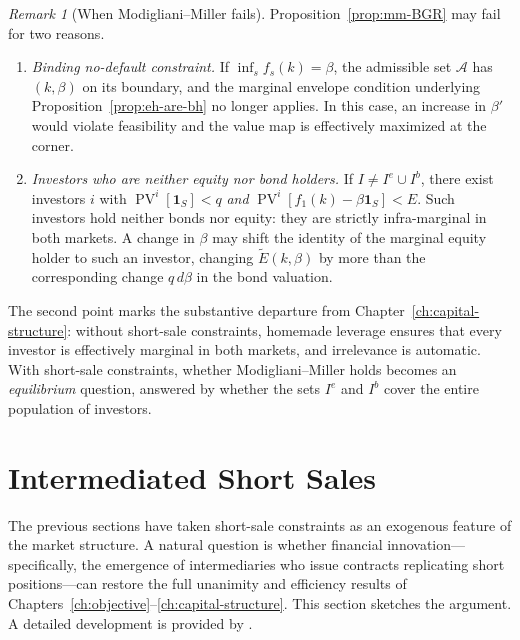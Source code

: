 \documentclass[11pt,a4paper,oneside]{book}
\def\1{\mathbf{1}}
\DeclareMathOperator{\PV}{PV}
\theoremstyle{plain}
\theoremstyle{definition}
\theoremstyle{remark}
\newtheorem{remark}[theorem]{Remark}
\numberwithin{equation}{chapter}
\begin{document}
\begin{remark}[When Modigliani--Miller fails]\label{rem:mm-fails-BGR}
Proposition~\ref{prop:mm-BGR} may fail for two reasons.
\begin{enumerate}
  \item \emph{Binding no-default constraint.}
  If $\inf_s f_s(k) = \beta$, the admissible set $\mathcal{A}$ has $(k, \beta)$ on its boundary, and the marginal envelope condition underlying Proposition~\ref{prop:eh-are-bh} no longer applies.
  In this case, an increase in $\beta'$ would violate feasibility and the value map is effectively maximized at the corner.
  \item \emph{Investors who are neither equity nor bond holders.}
  If $I \neq I^e \cup I^b$, there exist investors $i$ with $\PV^i[\1_S] < q$ \emph{and} $\PV^i[f_1(k) - \beta \1_S] < E$.
  Such investors hold neither bonds nor equity: they are strictly infra-marginal in both markets.
  A change in $\beta$ may shift the identity of the marginal equity holder to such an investor, changing $\widetilde{E}(k, \beta)$ by more than the corresponding change $q \, d\beta$ in the bond valuation.
\end{enumerate}
The second point marks the substantive departure from Chapter~\ref{ch:capital-structure}: without short-sale constraints, homemade leverage ensures that every investor is effectively marginal in both markets, and irrelevance is automatic.
With short-sale constraints, whether Modigliani--Miller holds becomes an \emph{equilibrium} question, answered by whether the sets $I^e$ and $I^b$ cover the entire population of investors.
\end{remark}

\section{Intermediated Short Sales}
\label{sec:intermediated}

The previous sections have taken short-sale constraints as an exogenous feature of the market structure.
A natural question is whether financial innovation---specifically, the emergence of intermediaries who issue contracts replicating short positions---can restore the full unanimity and efficiency results of Chapters~\ref{ch:objective}--\ref{ch:capital-structure}.
This section sketches the argument.
A detailed development is provided by \citet{BisinGottardiRuta2015}.
\end{document}
